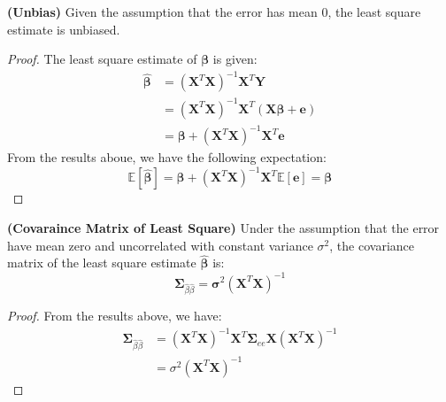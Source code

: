 \begin{theorem}{\textbf{(Unbias)}}
    Given the assumption that the error has mean $0$, the least square estimate is unbiased. 
\end{theorem}
\begin{proof}
    The least square estimate of $\boldsymbol \beta$ is given:
    \begin{equation*}
    \begin{aligned}
        \hat{\boldsymbol \beta} &= (\boldsymbol X^T\boldsymbol X)^{-1}\boldsymbol X^T\boldsymbol Y \\
        &= (\boldsymbol X^T\boldsymbol X)^{-1}\boldsymbol X^T(\boldsymbol X\boldsymbol \beta + \boldsymbol e) \\
        &= \boldsymbol \beta + (\boldsymbol X^T\boldsymbol X)^{-1}\boldsymbol X^T\boldsymbol e
    \end{aligned}
    \end{equation*}
    From the results aboue, we have the following expectation:
    \begin{equation*}
        \mathbb{E}[\hat{\boldsymbol \beta}] = \boldsymbol \beta + (\boldsymbol X^T\boldsymbol X)^{-1}\boldsymbol X^T \mathbb{E}[\boldsymbol e] = \boldsymbol \beta
    \end{equation*}
\end{proof}

\begin{theorem}{\textbf{(Covaraince Matrix of Least Square)}}
    Under the assumption that the error have mean zero and uncorrelated with constant variance $\sigma^2$, the covariance matrix of the least square estimate $\hat{\boldsymbol \beta}$ is:
    \begin{equation*}
        \boldsymbol \Sigma_{\hat{\beta}\hat{\beta}} = \boldsymbol \sigma^2(\boldsymbol X^T\boldsymbol X)^{-1}
    \end{equation*}
\end{theorem}
\begin{proof}
    From the results above, we have:
    \begin{equation*}
    \begin{aligned}
        \boldsymbol \Sigma_{\hat{\beta}\hat{\beta}} &= (\boldsymbol X^T\boldsymbol X)^{-1}\boldsymbol X^T\boldsymbol \Sigma_{ee} \boldsymbol X(\boldsymbol X^T\boldsymbol X)^{-1} \\
        &= \sigma^2(\boldsymbol X^T\boldsymbol X)^{-1}
    \end{aligned}
    \end{equation*}
\end{proof}
        
